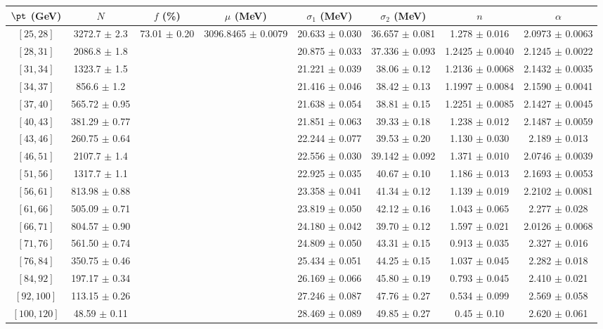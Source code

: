 \begin{tabular}{c||c|c|c|c|c|c|c}
$\pt$ (GeV) & $N$ & $f$ (\%) & $\mu$ (MeV) & $\sigma_1$ (MeV) & $\sigma_2$ (MeV) & $n$ & $\alpha$ \\
\hline
$[25, 28]$ & 3272.7 $\pm$ 2.3 & \multirow{17}{*}{73.01 $\pm$ 0.20} & \multirow{17}{*}{3096.8465 $\pm$ 0.0079} & 20.633 $\pm$ 0.030 & 36.657 $\pm$ 0.081 & 1.278 $\pm$ 0.016 & 2.0973 $\pm$ 0.0063\\
$[28, 31]$ & 2086.8 $\pm$ 1.8 &  &  & 20.875 $\pm$ 0.033 & 37.336 $\pm$ 0.093 & 1.2425 $\pm$ 0.0040 & 2.1245 $\pm$ 0.0022\\
$[31, 34]$ & 1323.7 $\pm$ 1.5 &  &  & 21.221 $\pm$ 0.039 & 38.06 $\pm$ 0.12 & 1.2136 $\pm$ 0.0068 & 2.1432 $\pm$ 0.0035\\
$[34, 37]$ & 856.6 $\pm$ 1.2 &  &  & 21.416 $\pm$ 0.046 & 38.42 $\pm$ 0.13 & 1.1997 $\pm$ 0.0084 & 2.1590 $\pm$ 0.0041\\
$[37, 40]$ & 565.72 $\pm$ 0.95 &  &  & 21.638 $\pm$ 0.054 & 38.81 $\pm$ 0.15 & 1.2251 $\pm$ 0.0085 & 2.1427 $\pm$ 0.0045\\
$[40, 43]$ & 381.29 $\pm$ 0.77 &  &  & 21.851 $\pm$ 0.063 & 39.33 $\pm$ 0.18 & 1.238 $\pm$ 0.012 & 2.1487 $\pm$ 0.0059\\
$[43, 46]$ & 260.75 $\pm$ 0.64 &  &  & 22.244 $\pm$ 0.077 & 39.53 $\pm$ 0.20 & 1.130 $\pm$ 0.030 & 2.189 $\pm$ 0.013\\
$[46, 51]$ & 2107.7 $\pm$ 1.4 &  &  & 22.556 $\pm$ 0.030 & 39.142 $\pm$ 0.092 & 1.371 $\pm$ 0.010 & 2.0746 $\pm$ 0.0039\\
$[51, 56]$ & 1317.7 $\pm$ 1.1 &  &  & 22.925 $\pm$ 0.035 & 40.67 $\pm$ 0.10 & 1.186 $\pm$ 0.013 & 2.1693 $\pm$ 0.0053\\
$[56, 61]$ & 813.98 $\pm$ 0.88 &  &  & 23.358 $\pm$ 0.041 & 41.34 $\pm$ 0.12 & 1.139 $\pm$ 0.019 & 2.2102 $\pm$ 0.0081\\
$[61, 66]$ & 505.09 $\pm$ 0.71 &  &  & 23.819 $\pm$ 0.050 & 42.12 $\pm$ 0.16 & 1.043 $\pm$ 0.065 & 2.277 $\pm$ 0.028\\
$[66, 71]$ & 804.57 $\pm$ 0.90 &  &  & 24.180 $\pm$ 0.042 & 39.70 $\pm$ 0.12 & 1.597 $\pm$ 0.021 & 2.0126 $\pm$ 0.0068\\
$[71, 76]$ & 561.50 $\pm$ 0.74 &  &  & 24.809 $\pm$ 0.050 & 43.31 $\pm$ 0.15 & 0.913 $\pm$ 0.035 & 2.327 $\pm$ 0.016\\
$[76, 84]$ & 350.75 $\pm$ 0.46 &  &  & 25.434 $\pm$ 0.051 & 44.25 $\pm$ 0.15 & 1.037 $\pm$ 0.045 & 2.282 $\pm$ 0.018\\
$[84, 92]$ & 197.17 $\pm$ 0.34 &  &  & 26.169 $\pm$ 0.066 & 45.80 $\pm$ 0.19 & 0.793 $\pm$ 0.045 & 2.410 $\pm$ 0.021\\
$[92, 100]$ & 113.15 $\pm$ 0.26 &  &  & 27.246 $\pm$ 0.087 & 47.76 $\pm$ 0.27 & 0.534 $\pm$ 0.099 & 2.569 $\pm$ 0.058\\
$[100, 120]$ & 48.59 $\pm$ 0.11 &  &  & 28.469 $\pm$ 0.089 & 49.85 $\pm$ 0.27 & 0.45 $\pm$ 0.10 & 2.620 $\pm$ 0.061\\
\end{tabular}
